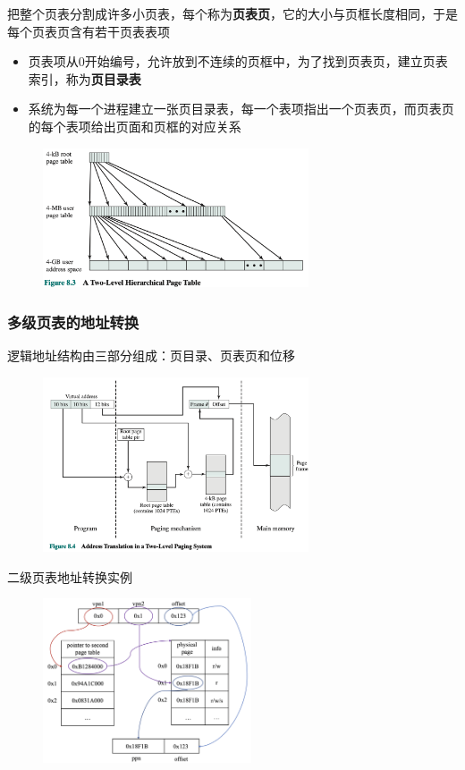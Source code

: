 \documentclass[cs4size,a4paper,10pt]{ctexart}
\begin{document}
		把整个页表分割成许多小页表，每个称为\textbf{页表页}，它的大小与页框长度相同，于是每个页表页含有若干页表表项
		\begin{itemize}
			\item 页表项从0开始编号，允许放到不连续的页框中，为了找到页表页，建立页表索引，称为\textbf{页目录表}
			\item 系统为每一个进程建立一张页目录表，每一个表项指出一个页表页，而页表页的每个表项给出页面和页框的对应关系
		\end{itemize}
		
		\begin{figure}[H]
			\centering
			\includegraphics[width=0.7\textwidth]{img/3.3.3.1.1}
		\end{figure}

		\subsubsection{多级页表的地址转换}
		逻辑地址结构由三部分组成：页目录、页表页和位移
		\begin{figure}[H]
			\centering
			\includegraphics[width=0.7\textwidth]{img/3.3.3.2.1}
		\end{figure}

		二级页表地址转换实例
		\begin{figure}[H]
			\centering
			\includegraphics[width=0.55\textwidth]{img/3.3.3.2.2}
		\end{figure}
\end{document}
